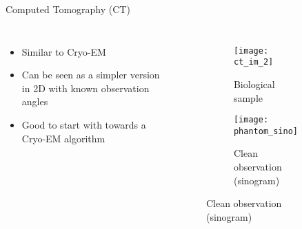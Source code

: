 

\begin{frame}[c]{Computed Tomography (CT)}
    \pause
    \begin{columns}[c]
            \begin{itemize}
                \item<2-> Similar to Cryo-EM
                \item<2-> Can be seen as a simpler version in 2D with known observation angles
                \item<2-> Good to start with towards a Cryo-EM algorithm
            \end{itemize}
        
        \pause
        \begin{figure}
            \centering
            \begin{subfigure}[t]{0.4\textwidth}
                \texttt{[image: ct\_im\_2]}
                \caption{Biological sample}
            \end{subfigure}\hfill                
            \begin{subfigure}[t]{0.51\textwidth}
                \texttt{[image: phantom\_sino]}
                \caption{Clean observation (sinogram)}
            \end{subfigure}\hfill          
        \end{figure}

        
    \end{columns}
\end{frame}


